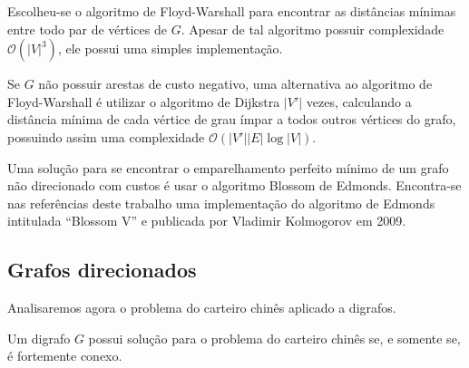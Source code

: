 Escolheu-se o algoritmo de Floyd-Warshall para encontrar as distâncias mínimas entre todo par de vértices de $G$.
Apesar de tal algoritmo possuir complexidade $\mathcal{O}(|V|^3)$, ele possui uma simples implementação.

Se $G$ não possuir arestas de custo negativo, uma alternativa ao algoritmo de Floyd-Warshall é utilizar o algoritmo de Dijkstra $|V'|$ vezes, calculando a distância mínima de cada vértice de grau ímpar a todos outros vértices do grafo, possuindo assim uma complexidade $\mathcal{O}(|V'||E|\log|V|)$. 

Uma solução para se encontrar o emparelhamento perfeito mínimo de um grafo não direcionado com custos é usar o algoritmo Blossom de Edmonds\cite{blossom}. 
Encontra-se nas referências deste trabalho uma implementação do algoritmo de Edmonds intitulada ``Blossom V'' e publicada por Vladimir Kolmogorov em 2009\cite{kolmogorov}.

    \subsection{Grafos direcionados}

    Analisaremos agora o problema do carteiro chinês aplicado a digrafos.

    \begin{lemma}
        Um digrafo $G$ possui solução para o problema do carteiro chinês se, e somente se, é fortemente conexo.
    \end{lemma}

